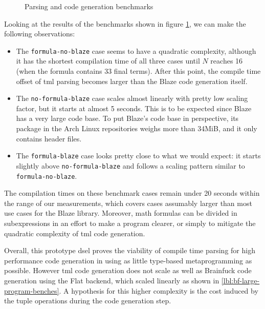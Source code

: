 \documentclass[../main]{subfiles}
\begin{document}
\begin{figure}[h]

\caption{Parsing and code generation benchmarks}
\label{fig:tml-ctbench}
\end{figure}

Looking at the results of the benchmarks shown in figure \ref{fig:tml-ctbench},
we can make the following observations:

\begin{itemize}

\item
The \lstinline{formula-no-blaze} case seems to have a quadratic complexity,
although it has the shortest compilation time of all three cases until $N$
reaches 16 (\ie when the formula contains 33 final terms).
After this point, the compile time offset of \gls{tml} parsing becomes larger
than the Blaze code generation itself.

\item
The \lstinline{no-formula-blaze} case scales almost linearly with pretty low
scaling factor, but it starts at almost 5 seconds.
This is to be expected since Blaze has a very large code base.
To put Blaze's code base in perspective, its package in the Arch Linux
repositories weighs more than 34MiB, and it only contains \cpp header files.

\item
The \lstinline{formula-blaze} case looks pretty close to what we would expect:
it starts slightly above \lstinline{no-formula-blaze} and follows a scaling
pattern similar to \lstinline{formula-no-blaze}.

\end{itemize}

The compilation times on these benchmark cases remain under 20 seconds
within the range of our measurements, which covers cases assumably larger
than most use cases for the Blaze library.
Moreover, math formulas can be divided in subexpressions in an effort to
make a program clearer, or simply to mitigate the quadratic complexity
of \gls{tml} code generation.

Overall, this prototype \gls{dsel} proves the viability of compile time parsing
for high performance code generation in  using as little type-based
metaprogramming as possible.
However \gls{tml} code generation does not scale as well as Brainfuck
code generation using the Flat backend, which scaled linearly as shown in
\ref{lbl:bf-large-program-benches}. A hypothesis for this higher complexity
is the cost induced by the tuple operations during the code generation step.
\end{document}
